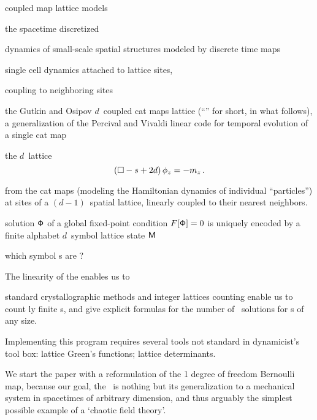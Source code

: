 coupled map lattice models

the spacetime discretized

dynamics of small-scale spatial structures modeled by discrete time
maps

single cell dynamics  attached to lattice sites,

coupling to neighboring sites

the Gutkin and Osipov
$d$\dmn\ coupled cat maps lattice
(``{\catlatt}'' for short, in what follows),
a {\spt} generalization of the Percival and Vivaldi {linear
code} for temporal evolution of a single cat map


the $d$\dmn\ lattice {\sPe}
\[
 (\Box -s+2d)\,\phi_{z}  =  -{m_{z}}
 \,.
\]

from the cat maps (modeling the
Hamiltonian dynamics of individual ``particles'') at sites of a
$(d\!-\!1)$\dmn\ spatial lattice, linearly coupled to their nearest
neighbors.

solution $\mathsf{\Phi}$ of a global fixed-point condition
$F[\mathsf{\Phi}]=0$ is uniquely encoded by a finite alphabet $d$\dmn\ symbol
lattice state  $\mathsf{M}$



which symbol \brick s are {\admissible}?

The  linearity of the {\catlatt} enables us to

standard crystallographic  methods and
integer lattices counting enable us to count {\spt}ly finite \brick s,
and give explicit formulas for the number of \dtor\ solutions
for \brick s of any size.

Implementing this program requires several tools not standard in
dynamicist's tool box: lattice Green's functions; lattice determinants.

We start the paper with a reformulation of the 1 degree of freedom
Bernoulli map, because our goal, the \catlatt\ is nothing but its
generalization to a mechanical system in spacetimes of arbitrary
dimension, and thus arguably the simplest possible example of a `chaotic
field theory'.

\bigskip

